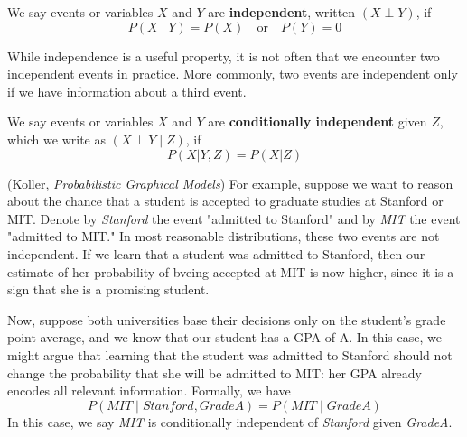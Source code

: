 \documentclass{discussion}
\begin{document}
\begin{definition}
We say events or variables $X$ and $Y$ are \textbf{independent}, written $(X \perp Y)$, if
    \begin{equation*}
    P(X \mid Y) = P(X) \quad \text{or} \quad P(Y) = 0
    \end{equation*}
\end{definition}

While independence is a useful property, it is not often that we encounter two independent events in practice.  More commonly, two events are independent only if we have information about a third event.

\begin{definition}
We say events or variables $X$ and $Y$ are \textbf{conditionally independent} given $Z$, which we write as $(X \perp Y \mid Z)$, if
    \begin{equation*}
    P(X|Y,Z) = P(X|Z)
    \end{equation*}
\end{definition}

\begin{example} (Koller, \textit{Probabilistic Graphical Models})
For example, suppose we want to reason about the chance that a student is accepted to graduate studies at Stanford or MIT.  Denote by \textit{Stanford} the event "admitted to Stanford" and by \textit{MIT} the event "admitted to MIT."  In most reasonable distributions, these two events are not independent.  If we learn that a student was admitted to Stanford, then our estimate of her probability of bveing accepted at MIT is now higher, since it is a sign that she is a promising student.  

Now, suppose both universities base their decisions only on the student's grade point average, and we know that our student has a GPA of A.  In this case, we might argue that learning that the student was admitted to Stanford should not change the probability that she will be admitted to MIT:  her GPA already encodes all relevant information.  Formally, we have
    \begin{equation*}
    P(MIT \mid Stanford, GradeA) = P(MIT \mid GradeA)
    \end{equation*}
In this case, we say \textit{MIT} is conditionally independent of \textit{Stanford} given \textit{GradeA}.
\end{example}
\end{document}
